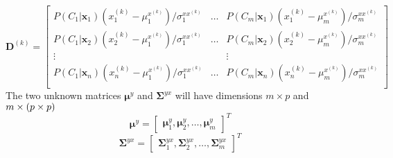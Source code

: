 \begin{equation}
	\label{eq:D_matrix_new}
	\mathbf{D}^{(k)} = \begin{bmatrix}
		P(C_1\vert \mathbf{x}_1) (x_1^{(k)} - \mu_1^{x^{(k)}})/\sigma_1^{xx^{(k)}} & \dots & P(C_m\vert \mathbf{x}_1) (x_1^{(k)} - \mu_m^{x^{(k)}})/\sigma_m^{xx^{(k)}} \\
		P(C_1\vert \mathbf{x}_2) (x_2^{(k)} - \mu_1^{x^{(k)}})/\sigma_1^{xx^{(k)}} & \dots & P(C_m\vert \mathbf{x}_2) (x_2^{(k)} - \mu_m^{x^{(k)}})/\sigma_m^{xx^{(k)}} \\
		\vdots & & \vdots \\
		P(C_1\vert \mathbf{x}_n) (x_n^{(k)} - \mu_1^{x^{(k)}})/\sigma_1^{xx^{(k)}} & \dots & P(C_m\vert \mathbf{x}_n) (x_n^{(k)} - \mu_m^{x^{(k)}})/\sigma_m^{xx^{(k)}} \\
	\end{bmatrix}
\end{equation}
The two unknown matrices $\boldsymbol{\mu}^y$ and $\mathbf{\Sigma}^{yx}$ will have dimensions $m\times p$ and $m \times \left(p\times p\right)$ 
\begin{equation}
	\label{eq:v_matrix}
	\boldsymbol{\mu}^y = 
	\begin{bmatrix}
		\boldsymbol{\mu}^y_1, \boldsymbol{\mu}^y_2, \dotsc, \boldsymbol{\mu}^y_m
	\end{bmatrix}^T
\end{equation}
\begin{equation}
	\label{gamma_matrix}
	\mathbf{\Sigma}^{yx} = 
	\begin{bmatrix}
		\mathbf{\Sigma}_1^{yx}, \mathbf{\Sigma}_2^{yx}, \dotsc, \mathbf{\Sigma}_m^{yx}
	\end{bmatrix}^T
\end{equation}

